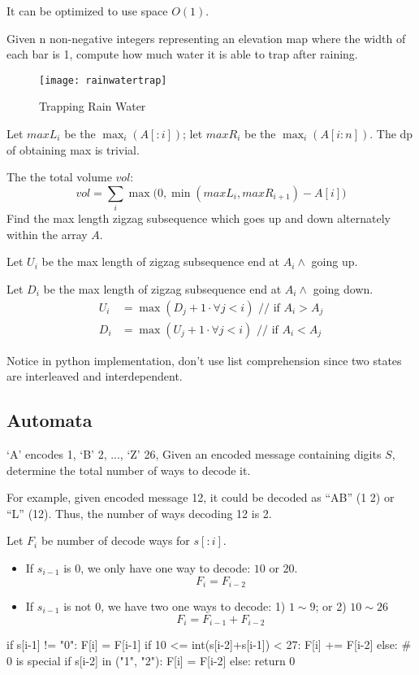 {It can be optimized to use space $O(1)$. 

Given n non-negative integers representing an elevation map where the width of each
bar is 1, compute how much water it is able to trap after raining.
\begin{figure}[]
    \centerline{\texttt{[image: rainwatertrap]}}
    \caption{Trapping Rain Water}
  \label{fig:rainwatertrap}
\end{figure}

Let $maxL_i$ be the $\max_{i}(A[:i])$; let $maxR_i$ be the $\max_{i}(A[i:n])$. The dp of obtaining max is trivial. 

The the total volume $vol$:
$$
vol = \sum_i\max\big(0,\min(maxL_i, maxR_{i+1})-A[i]\big)
$$
 Find the max length zigzag subsequence which goes up and down alternately within the array $A$.

Let $U_i$ be the max length of zigzag subsequence end at $A_i \wedge$ going up.

Let $D_i$ be the max length of zigzag subsequence end at $A_i \wedge$ going down.
\begin{align*}
U_i &= \max(D_j+1 \cdot \forall j < i) \text{ // if $A_i > A_j$} \\ 
D_i &= \max(U_j+1 \cdot \forall j < i) \text{ // if $A_i < A_j$} 
\end{align*}

Notice in python implementation, don't use list comprehension since two states are interleaved and interdependent. 
\subsection{Automata}
 `A' encodes 1, `B' 2, ..., `Z' 26, Given an encoded message containing digits $S$, determine the total number of ways to decode it.

For example, given encoded message 12, it could be decoded as ``AB'' (1 2) or ``L'' (12). Thus, the number of ways decoding 12 is 2.

Let $F_i$ be number of decode ways for $s[:i]$. 

\begin{itemize}
\item If $s_{i-1}$ is 0, we only have one way to decode: $10$ or $20$.
$$
F_i = F_{i-2}
$$ 
\item If $s_{i-1}$ is not 0, we have two one ways to decode: 1) $1 \sim 9$; or 2) $10 \sim26$
$$
F_i = F_{i-1}+F_{i-2}
$$
\end{itemize}
\begin{python}
if s[i-1] != "0":
    F[i] = F[i-1]
    if 10 <= int(s[i-2]+s[i-1]) < 27:
        F[i] += F[i-2]
else:  # 0 is special
    if s[i-2] in ("1", "2"):
        F[i] = F[i-2]
    else:
        return 0
\end{python}
}
